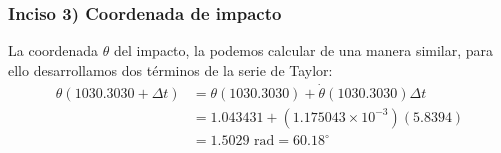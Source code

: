 \begin{frame}
\frametitle{Inciso 3) Coordenada de impacto}
La coordenada $\theta$ del impacto, la podemos calcular de una manera similar, para ello desarrollamos dos términos de la serie de Taylor:
\[ \begin{split}
\theta(1030.3030 + \Delta t) &= \theta(1030.3030) + \dot{\theta}(1030.3030)\Delta t \\
 &= 1.043431 + (1.175043 \times 10^{-3} )(5.8394) \\
 &= 1.5029 \mbox{ rad} = 60.18^{\circ}
\end{split} \]
\end{frame}

